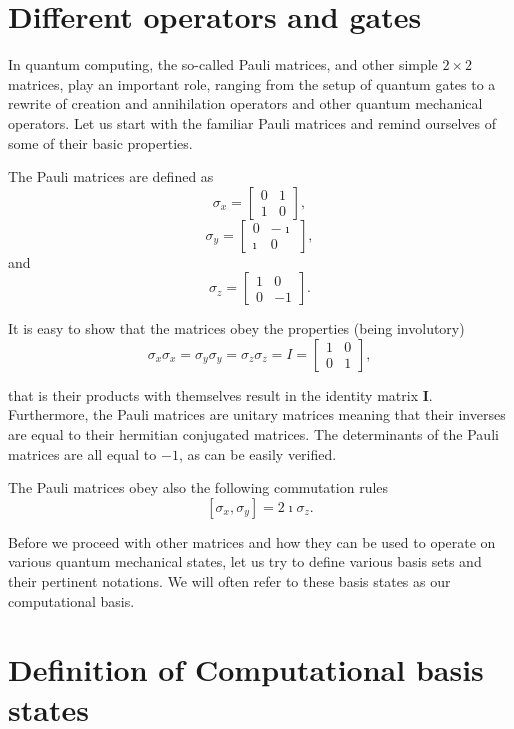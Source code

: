 \section{Different operators and gates}

In quantum computing, the so-called Pauli matrices, and other simple
$2\times 2$ matrices, play an important role, ranging from the setup
of quantum gates to a rewrite of creation and annihilation operators
and other quantum mechanical operators. Let us start with the familiar
Pauli matrices and remind ourselves of some of their basic properties.

The Pauli matrices are defined as
\[
\sigma_x = \begin{bmatrix} 0 & 1 \\ 1 & 0 \end{bmatrix},
\]
\[
\sigma_y = \begin{bmatrix} 0 & -\imath \\ \imath & 0 \end{bmatrix},
\]
and
\[
\sigma_z = \begin{bmatrix} 1 & 0 \\ 0 & -1 \end{bmatrix}.
\]

It is easy to show that the matrices obey the properties (being involutory)
\[
\sigma_x\sigma_x = \sigma_y\sigma_y=\sigma_z\sigma_z = I=\begin{bmatrix} 1 & 0 \\ 0 & 1\end{bmatrix},
\]

that is their products with themselves result in the identity matrix
$\bm{I}$.  Furthermore, the Pauli matrices are unitary matrices
meaning that their inverses are equal to their hermitian conjugated
matrices. The determinants of the Pauli matrices are all equal to $-1$,
as can be easily verified.

The Pauli matrices obey also the following commutation rules
\[
\left[\sigma_x,\sigma_y\right] = 2\imath \sigma_z.
\]

Before we proceed with other matrices and how they can be used to
operate on various quantum mechanical states, let us try to define
various basis sets and their pertinent notations. We will often refer
to these basis states as our computational basis.

\section{Definition of Computational basis states}

